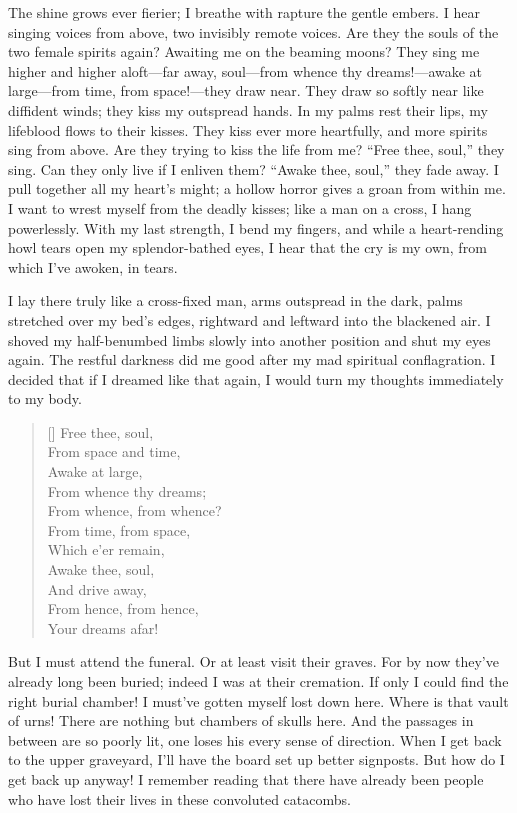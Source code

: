 \documentclass[12pt,a4paper]{article}
\begin{document}
The shine grows ever fierier; I breathe with rapture the gentle embers. I hear singing voices from above, two invisibly remote voices. Are they the souls of the two female spirits again? Awaiting me on the beaming moons? They sing me higher and higher aloft—far away, soul—from whence thy dreams!—awake at large—from time, from space!—they draw near. They draw so softly near like diffident winds; they kiss my outspread hands. In my palms rest their lips, my lifeblood flows to their kisses. They kiss ever more heartfully, and more spirits sing from above. Are they trying to kiss the life from me? “Free thee, soul,” they sing. Can they only live if I enliven them? “Awake thee, soul,” they fade away. I pull together all my heart’s might; a hollow horror gives a groan from within me. I want to wrest myself from the deadly kisses; like a man on a cross, I hang powerlessly. With my last strength, I bend my fingers, and while a heart-rending howl tears open my splendor-bathed eyes, I hear that the cry is my own, from which I’ve awoken, in tears.

I lay there truly like a cross-fixed man, arms outspread in the dark, palms stretched over my bed’s edges, rightward and leftward into the blackened air. I shoved my half-benumbed limbs slowly into another position and shut my eyes again. The restful darkness did me good after my mad spiritual conflagration. I decided that if I dreamed like that again, I would turn my thoughts immediately to my body.
\settowidth{\versewidth}{From whence, from whence?}
\begin{verse}[\versewidth]
Free thee, soul, \\
From space and time, \\
Awake at large, \\
From whence thy dreams; \\
From whence, from whence? \\
From time, from space, \\
Which e’er remain, \\
Awake thee, soul, \\
And drive away, \\
From hence, from hence, \\
Your dreams afar! 
\end{verse}
\vspace{20pt}\noindent{}\vspace{10pt}

But I must attend the funeral. Or at least visit their graves. For by now they’ve already long been buried; indeed I was at their cremation. If only I could find the right burial chamber! I must’ve gotten myself lost down here. Where is that vault of urns! There are nothing but chambers of skulls here. And the passages in between are so poorly lit, one loses his every sense of direction. When I get back to the upper graveyard, I’ll have the board set up better signposts. But how do I get back up anyway! I remember reading that there have already been people who have lost their lives in these convoluted catacombs.
\end{document}
